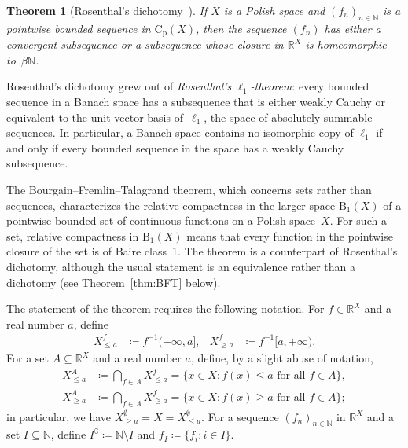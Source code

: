 \documentclass[psamsfonts]{amsart}
\newtheorem{thm}{Theorem}[section]
\theoremstyle{definition}
\theoremstyle{remark}
\newcommand{\Cp}{\mathrm{C}_{\mathrm{p}}}
\numberwithin{equation}{section}
\begin{document}
\begin{thm}[Rosenthal’s dichotomy~\cite{Rosenthal:1974}]
  \label{thm:Rosenthal}
  If $X$ is a Polish space and $(f_n)_{n\in\mathbb{N}}$ is a pointwise bounded sequence in $\Cp(X)$, then the sequence $(f_n)$ has either a convergent subsequence or a subsequence whose closure in $\mathbb{R}^X$ is homeomorphic to~$\beta\mathbb{N}$.
\end{thm}

Rosenthal's dichotomy grew out of \emph{Rosenthal’s $\ell_1$-theorem}: every bounded sequence in a Banach space has a subsequence that is either weakly Cauchy or equivalent to the unit vector basis of~$\ell_1$, the space of absolutely summable sequences.
In particular, a Banach space contains no isomorphic copy of $\ell_1$ if and only if every bounded sequence in the space has a weakly Cauchy subsequence.

The Bourgain--Fremlin--Talagrand theorem, which concerns sets rather than sequences, characterizes the relative compactness in the larger space $\mathrm{B}_1(X)$ of a pointwise bounded set of continuous functions on a Polish space~$X$.
For such a set, relative compactness in $\mathrm{B}_1(X)$ means that every function in the pointwise closure of the set is of Baire class~1.
The theorem is a counterpart of Rosenthal’s dichotomy, although the usual statement is an equivalence rather than a dichotomy (see Theorem~\ref{thm:BFT} below).

The statement of the theorem requires the following notation.
For $f\in \mathbb{R}^X$ and a real number $a$, define
\begin{align*}
X^f_{\le a} & \coloneqq f^{-1}(-\infty,a],  &
X^f_{\ge a} & \coloneqq f^{-1}[a, +\infty).
\end{align*}
For a set $A\subseteq \mathbb{R}^X$ and a real number $a$, define, by a slight abuse of notation,
\begin{align*}
X^A_{\le a} & \coloneqq \bigcap_{f\in A}X^f_{\le a} = \{x\in X: \text{$f(x)\le a$ for all $f\in A$}\}, \\
X^A_{\ge a} & \coloneqq \bigcap_{f\in A}X^f_{\ge a} = \{x\in X: \text{$f(x)\ge a$ for all $f\in A$}\};
\end{align*}
in particular, we have $X^\emptyset_{\ge a} = X = X^\emptyset_{\le a}$.
For a sequence $(f_n)_{n\in\mathbb{N}}$ in $\mathbb{R}^X$ and a set $I\subseteq \mathbb{N}$, define $I^{\complement} \coloneqq \mathbb{N}\setminus I$ and $f_I \coloneqq \{f_i: i\in I\}$.
\end{document}

